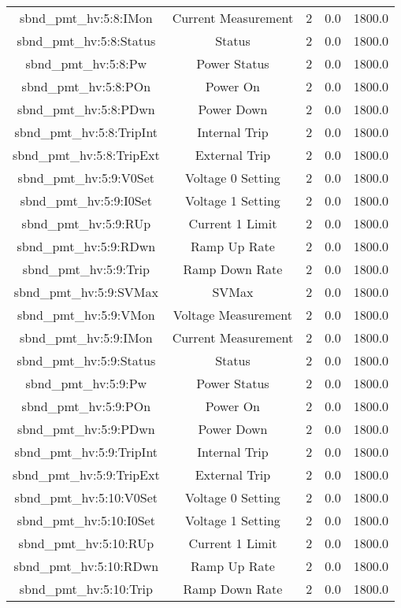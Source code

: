 \begin{center}
\begin{longtable}{c | c c c c }
sbnd\_pmt\_hv:5:8:IMon & Current Measurement & 2 & 0.0 & 1800.0\\ 
sbnd\_pmt\_hv:5:8:Status & Status & 2 & 0.0 & 1800.0\\ 
sbnd\_pmt\_hv:5:8:Pw & Power Status & 2 & 0.0 & 1800.0\\ 
sbnd\_pmt\_hv:5:8:POn & Power On & 2 & 0.0 & 1800.0\\ 
sbnd\_pmt\_hv:5:8:PDwn & Power Down & 2 & 0.0 & 1800.0\\ 
sbnd\_pmt\_hv:5:8:TripInt & Internal Trip & 2 & 0.0 & 1800.0\\ 
sbnd\_pmt\_hv:5:8:TripExt & External Trip & 2 & 0.0 & 1800.0\\ 
sbnd\_pmt\_hv:5:9:V0Set & Voltage 0 Setting & 2 & 0.0 & 1800.0\\ 
sbnd\_pmt\_hv:5:9:I0Set & Voltage 1 Setting & 2 & 0.0 & 1800.0\\ 
sbnd\_pmt\_hv:5:9:RUp & Current 1 Limit & 2 & 0.0 & 1800.0\\ 
sbnd\_pmt\_hv:5:9:RDwn & Ramp Up Rate & 2 & 0.0 & 1800.0\\ 
sbnd\_pmt\_hv:5:9:Trip & Ramp Down Rate & 2 & 0.0 & 1800.0\\ 
sbnd\_pmt\_hv:5:9:SVMax & SVMax & 2 & 0.0 & 1800.0\\ 
sbnd\_pmt\_hv:5:9:VMon & Voltage Measurement & 2 & 0.0 & 1800.0\\ 
sbnd\_pmt\_hv:5:9:IMon & Current Measurement & 2 & 0.0 & 1800.0\\ 
sbnd\_pmt\_hv:5:9:Status & Status & 2 & 0.0 & 1800.0\\ 
sbnd\_pmt\_hv:5:9:Pw & Power Status & 2 & 0.0 & 1800.0\\ 
sbnd\_pmt\_hv:5:9:POn & Power On & 2 & 0.0 & 1800.0\\ 
sbnd\_pmt\_hv:5:9:PDwn & Power Down & 2 & 0.0 & 1800.0\\ 
sbnd\_pmt\_hv:5:9:TripInt & Internal Trip & 2 & 0.0 & 1800.0\\ 
sbnd\_pmt\_hv:5:9:TripExt & External Trip & 2 & 0.0 & 1800.0\\ 
sbnd\_pmt\_hv:5:10:V0Set & Voltage 0 Setting & 2 & 0.0 & 1800.0\\ 
sbnd\_pmt\_hv:5:10:I0Set & Voltage 1 Setting & 2 & 0.0 & 1800.0\\ 
sbnd\_pmt\_hv:5:10:RUp & Current 1 Limit & 2 & 0.0 & 1800.0\\ 
sbnd\_pmt\_hv:5:10:RDwn & Ramp Up Rate & 2 & 0.0 & 1800.0\\ 
sbnd\_pmt\_hv:5:10:Trip & Ramp Down Rate & 2 & 0.0 & 1800.0\\ 

\end{longtable}
\end{center}
